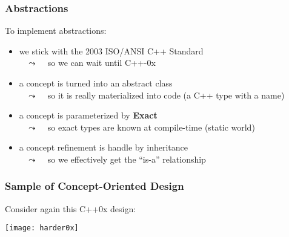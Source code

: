 \begin{frame}
  \frametitle{Abstractions}

To implement abstractions:

\medskip

\begin{itemize}
\item we stick with the 2003 ISO/ANSI C++ Standard\\
  ~ {\scriptsize{$\leadsto$ ~ so we can wait until C++-0x}}
%
  \smallskip
\item a concept is turned into an abstract class\\
  ~ {\scriptsize{$\leadsto$ ~ so it is really materialized into code (a C++ type with a name)}}
%
  \smallskip
\item a concept is parameterized by \textbf{Exact}\\
  ~ {\scriptsize{$\leadsto$ ~ so exact types are known at compile-time (static world)}}
%
  \smallskip
\item a concept refinement is handle by inheritance\\ 
  ~ {\scriptsize{$\leadsto$ ~ so we effectively get the ``is-a'' relationship}}
\end{itemize}


\end{frame}



\begin{frame}
  \frametitle{Sample of Concept-Oriented Design}

\vspace*{-2mm}
Consider again this C++0x design:

\medskip

\hspace*{-5mm}
\texttt{[image: harder0x]}

\end{frame}



